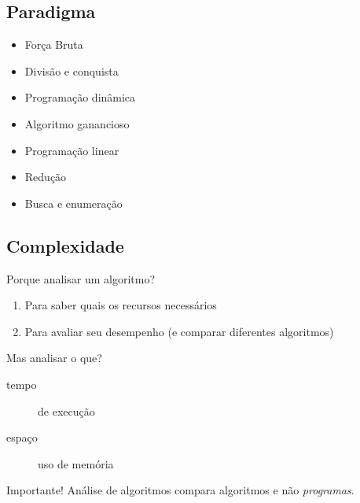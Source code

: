 \subsection{Paradigma}%
\begin{frame}[label=main]
	\begin{itemize}[<+->]
		\item Força Bruta%
		\item Divisão e conquista%
		\item Programação dinâmica%
		\item Algoritmo ganancioso%
		\item Programação linear%
		\item Redução%
		\item Busca e enumeração%
	\end{itemize}
\end{frame}

\subsection{Complexidade}
\begin{frame}[label=main]
	Porque analisar um algoritmo?
	\begin{enumerate}
		\item Para saber quais os recursos necessários
		\item Para avaliar seu desempenho (e comparar diferentes algoritmos)
	\end{enumerate}
	\pause\vfill
	Mas analisar o que?
	\begin{description}
		\item[tempo] de execução
		\item[espaço] uso de memória
	\end{description}
	\pause\vfill
	\begin{alertblock}{Importante!}
		Análise de algoritmos compara \alert{algoritmos} e não \emph{programas}.
	\end{alertblock}
\end{frame}

